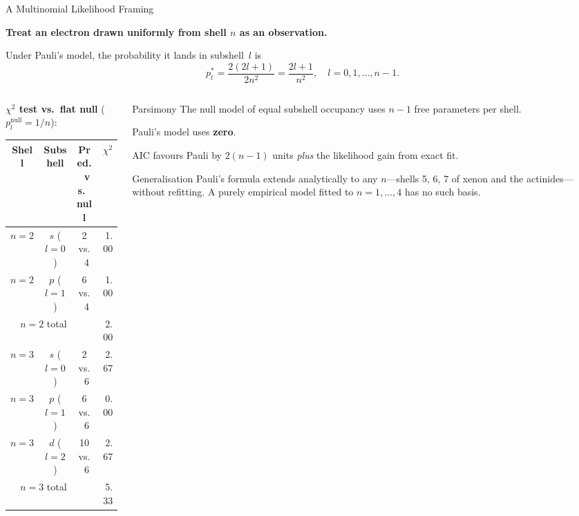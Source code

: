 \documentclass[aspectratio=169,12pt]{beamer}
\begin{document}
\begin{frame}[shrink=20]{A Multinomial Likelihood Framing}

\textbf{Treat an electron drawn uniformly from shell $n$ as an observation.}

\medskip
Under Pauli's model, the probability it lands in subshell~$l$ is
\[
  p^*_l = \frac{2(2l+1)}{2n^2} = \frac{2l+1}{n^2},
  \quad l = 0,1,\ldots,n-1.
\]

\medskip
\begin{columns}[T]
\begin{column}{0.52\textwidth}
\textbf{$\chi^2$ test vs.\ flat null} ($p^{\text{null}}_l = 1/n$):

\smallskip
\begin{tabular}{cccr}
\toprule
Shell & Subshell & Pred.\ vs.\ null & $\chi^2$ \\
\midrule
$n=2$ & $s$ ($l=0$) & 2 vs.\ 4 & 1.00 \\
$n=2$ & $p$ ($l=1$) & 6 vs.\ 4 & 1.00 \\
\midrule
\multicolumn{2}{r}{$n=2$ total} & & 2.00 \\
\midrule
$n=3$ & $s$ ($l=0$) & 2 vs.\ 6 & 2.67 \\
$n=3$ & $p$ ($l=1$) & 6 vs.\ 6 & 0.00 \\
$n=3$ & $d$ ($l=2$) & 10 vs.\ 6 & 2.67 \\
\midrule
\multicolumn{2}{r}{$n=3$ total} & & 5.33 \\
\bottomrule
\end{tabular}
\end{column}
\begin{column}{0.45\textwidth}
\begin{block}{Parsimony}
The null model of equal subshell
occupancy uses $n-1$ free parameters
per shell.

\smallskip
Pauli's model uses \textbf{zero}.

\smallskip
AIC favours Pauli by $2(n-1)$ units
\emph{plus} the likelihood gain from
exact fit.
\end{block}

\medskip
\begin{alertblock}{Generalisation}
Pauli's formula extends analytically
to any $n$---shells 5, 6, 7 of xenon
and the actinides---without refitting.
A purely empirical model fitted to
$n=1,\ldots,4$ has no such basis.
\end{alertblock}
\end{column}
\end{columns}

\end{frame}
\end{document}
